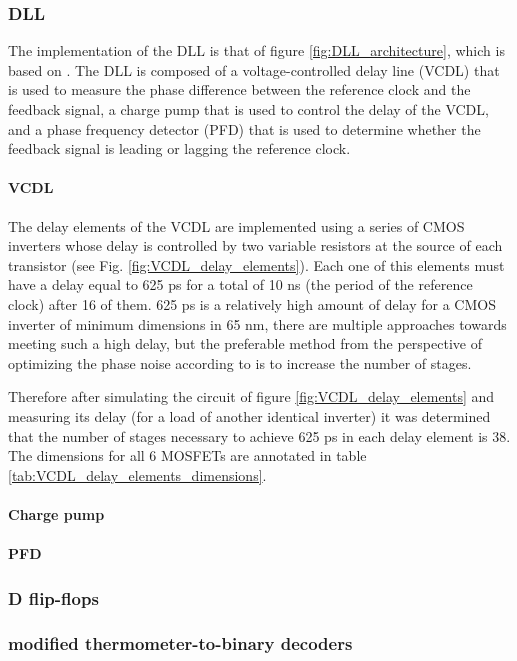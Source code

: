 \subsubsection{DLL}
The implementation of the DLL is that of figure \ref{fig:DLL_architecture}, which is based on \cite{bib:DLL_Razavi_paper}. The DLL is composed of a voltage-controlled delay line (VCDL) that is used
to measure the phase difference between the reference clock and the feedback signal, a charge pump that is used to control the delay of the VCDL, and a phase frequency detector (PFD) that is used to
determine whether the feedback signal is leading or lagging the reference clock.

\paragraph{VCDL}
The delay elements of the VCDL are implemented using a series of CMOS inverters whose delay is controlled by two variable resistors at the source of each transistor (see Fig. \ref{fig:VCDL_delay_elements}).
Each one of this elements must have a delay equal to 625 ps for a total of 10 ns (the period of the reference clock) after 16 of them. 625 ps is a relatively high amount of delay for a CMOS inverter of
minimum dimensions in 65 nm, there are multiple approaches towards meeting such a high delay, but the preferable method from the perspective of optimizing the phase noise according to \cite{bib:Razavi_PLL_book}
is to increase the number of stages.

Therefore after simulating the circuit of figure \ref{fig:VCDL_delay_elements} and measuring its delay (for a load of another identical inverter) it was determined that the number of stages necessary to achieve
625 ps in each delay element is 38. The dimensions for all 6 MOSFETs are annotated in table \ref{tab:VCDL_delay_elements_dimensions}.


\paragraph{Charge pump}
\paragraph{PFD}

\subsubsection{D flip-flops}

\subsubsection{modified thermometer-to-binary decoders}

